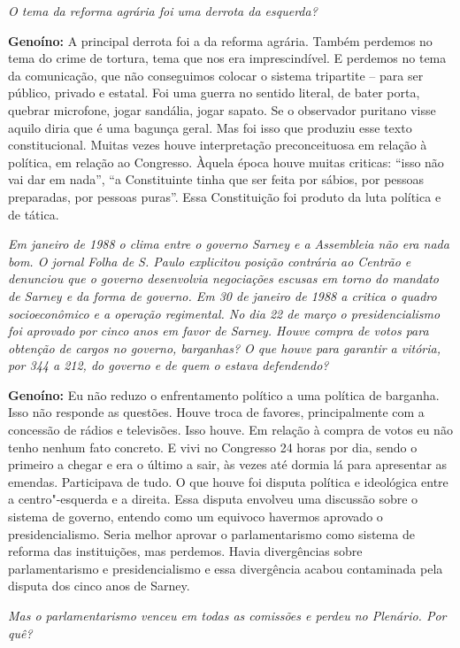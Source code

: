 \emph{O tema da reforma agrária foi uma derrota da esquerda?}

\textbf{Genoíno:} A principal derrota foi a da reforma agrária. Também
perdemos no tema do crime de tortura, tema que nos era imprescindível. E
perdemos no tema da comunicação, que não conseguimos colocar o sistema
tripartite -- para ser público, privado e estatal. Foi uma guerra no
sentido literal, de bater porta, quebrar microfone, jogar sandália,
jogar sapato. Se o observador puritano visse aquilo diria que é uma
bagunça geral. Mas foi isso que produziu esse texto constitucional.
Muitas vezes houve interpretação preconceituosa em relação à política,
em relação ao Congresso. Àquela época houve muitas criticas: ``isso não
vai dar em nada'', ``a Constituinte tinha que ser feita por sábios, por
pessoas preparadas, por pessoas puras''. Essa Constituição foi produto
da luta política e de tática.

\emph{Em janeiro de 1988 o clima entre o governo Sarney e a Assembleia
não era nada bom. O jornal Folha de S. Paulo explicitou posição
contrária ao Centrão e denunciou que o governo desenvolvia negociações
escusas em torno do mandato de Sarney e da forma de governo. Em 30 de
janeiro de 1988 a  critica o quadro socioeconômico e a operação
regimental. No dia 22 de março o presidencialismo foi aprovado por cinco
anos em favor de Sarney. Houve compra de votos para obtenção de cargos
no governo, barganhas? O que houve para garantir a vitória, por 344 a
212, do governo e de quem o estava defendendo?}

\textbf{Genoíno:} Eu não reduzo o enfrentamento político a uma política
de barganha. Isso não responde as questões. Houve troca de favores,
principalmente com a concessão de rádios e televisões. Isso houve. Em
relação à compra de votos eu não tenho nenhum fato concreto. E vivi no
Congresso 24 horas por dia, sendo o primeiro a chegar e era o último a
sair, às vezes até dormia lá para apresentar as emendas. Participava de
tudo. O que houve foi disputa política e ideológica entre a
centro"-esquerda e a direita. Essa disputa envolveu uma discussão sobre o
sistema de governo, entendo como um equivoco havermos aprovado o
presidencialismo. Seria melhor aprovar o parlamentarismo como sistema de
reforma das instituições, mas perdemos. Havia divergências sobre
parlamentarismo e presidencialismo e essa divergência acabou contaminada
pela disputa dos cinco anos de Sarney.

\emph{Mas o parlamentarismo venceu em todas as comissões e perdeu no
Plenário. Por quê?}

